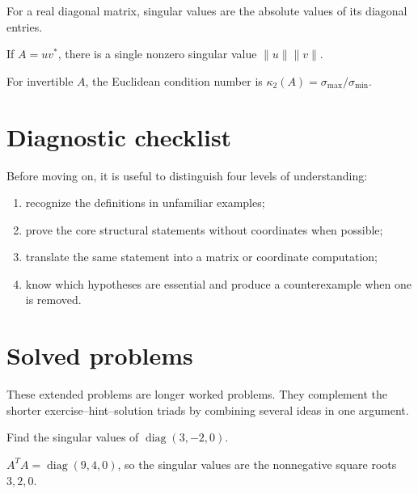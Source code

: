 \begin{example}\label{ex:i18-worked-01}
For a real diagonal matrix, singular values are the absolute values of its diagonal entries.
\end{example}

\begin{example}\label{ex:i18-worked-02}
If $A=uv^*$, there is a single nonzero singular value $\|u\|\|v\|$.
\end{example}

\begin{example}\label{ex:i18-worked-03}
For invertible $A$, the Euclidean condition number is $\kappa_2(A)=\sigma_{\max}/\sigma_{\min}$.
\end{example}

\section{Diagnostic checklist}
Before moving on, it is useful to distinguish four levels of understanding:
\begin{enumerate}
\item recognize the definitions in unfamiliar examples;
\item prove the core structural statements without coordinates when possible;
\item translate the same statement into a matrix or coordinate computation;
\item know which hypotheses are essential and produce a counterexample when one is removed.
\end{enumerate}

\section{Solved problems}
These extended problems are longer worked problems. They complement the shorter exercise--hint--solution triads by combining several ideas in one argument.

\begin{problem}\label{prob:i18-problem-01}
Find the singular values of $\operatorname{diag}(3,-2,0)$.
\end{problem}
\begin{solution}
$A^TA=\operatorname{diag}(9,4,0)$, so the singular values are the nonnegative square roots $3,2,0$.
\end{solution}

